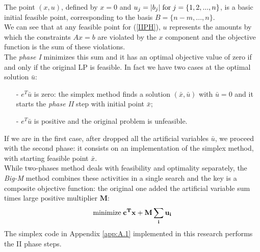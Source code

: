 \documentclass[a4paper,10 pt,titlepage,twoside]{book}
\theoremstyle{plain}
\theoremstyle{definition}
\theoremstyle{remark}
\begin{document}
The point $(x,u)$, defined by $x = 0$ and $u_{j} = |b_{j}| \text{\;for\;}j =\{1,2,...,n\}$, is a basic initial feasible point, corresponding to the basis $B = \{n-m,...,n\}$.\\ We can see that at any feasible point for (\ref{IIPH}), $u$ represents the amounts by which the constraints $Ax = b$ are violated by the $x$ component and the objective function is the sum of these violations. \\
The \textit{phase I} minimizes this sum and it has an optimal objective value of zero if and only if the original LP is feasible. In fact we have two cases at the optimal solution $\bar{u}$: 
\begin{itemize}
	\item[-]$e^{T}\bar{u}$ is zero: the simplex method finds a solution $(\bar{x},\bar{u})$ with $\bar{u}=0$ and it starts the \textit{phase II} step with initial point $\bar{x}$;
	\item[-]$e^{T}\bar{u}$ is positive and the original problem is unfeasible.
\end{itemize}
If we are in the first case, after dropped all the artificial variables $\bar{u}$, we proceed with the second phase: it consists on an implementation of the simplex method, with starting feasible point $\bar{x}$.\\ 
While two-phases method deals with feasibility and optimality separately, the \textit{Big-M} method combines these activities in a single search and the key is a composite objective function: the original one added the artificial variable sum times  large positive multiplier $\mathbf{M}$:\\
\begin{equation}
\text{minimize\;}\mathbf{c^{T}x+M \sum_{i}{u}_{i}}\\
\end{equation}
The simplex code in Appendix \ref{app:A.1} implemented in this research performs the II phase steps.
\end{document}
